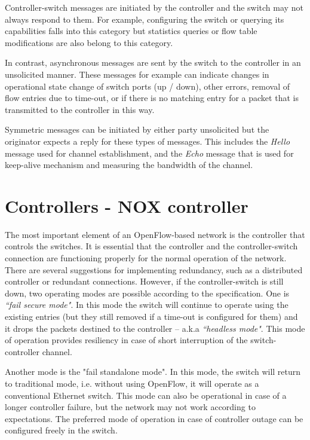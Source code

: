 \documentclass{article}
\begin{document}
Controller-switch messages are initiated by the controller and the switch may not always respond to them. For example,
configuring the switch or querying its capabilities falls into this category but statistics queries or flow table
modifications are also belong to this category.

In contrast, asynchronous messages are sent by the switch to the controller in an unsolicited manner. These messages
for example can indicate changes in  operational state change of switch ports (up / down), other errors, removal of
flow entries due to time-out, or if there is no matching entry for a packet that is transmitted to the controller in
this way.

Symmetric messages can be initiated by either party unsolicited but the originator expects a reply for these types of
messages. This includes the \emph{Hello} message used for channel establishment, and the \emph{Echo} message that is
used for keep-alive mechanism and measuring the bandwidth of the channel.

\section{Controllers - NOX controller}

The most important element of an OpenFlow-based network is the controller that controls the switches. It is essential
that the controller and the controller-switch connection are functioning properly for the normal operation of the
network. There are several suggestions for implementing redundancy, such as a distributed controller or redundant
connections.
However, if the controller-switch is still down, two operating modes are possible according to the specification. One
is \emph{``fail secure mode"}. In this mode the switch will continue to operate using the existing entries (but they
still removed if a time-out is configured for them) and it drops the packets destined to the controller -- a.k.a
\emph{``headless mode"}. This mode of operation provides resiliency in case of short interruption of the
switch-controller channel.

Another mode is the "fail standalone mode". In this mode, the switch will return to traditional mode, i.e. without
using OpenFlow, it will operate as a conventional Ethernet switch. This mode can also be operational in case of a
longer controller failure, but the network may not work according to expectations. The preferred mode of operation in
case of controller outage can be configured freely in the switch.
\end{document}
